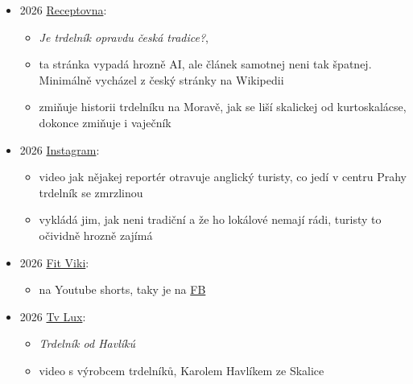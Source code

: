 \begin{itemize}
  \begin{itemize}
  \tightlist
  \item
     do trouby
  \end{itemize}
\item
  2026
  \href{https://www.receptovna.cz/cs/clanek/cestovani-a-svetove-kuchyne/je-trdelnik-opravdu-ceska-tradice}{Receptovna}:

  \begin{itemize}
  \tightlist
  \item
    \emph{Je trdelník opravdu česká tradice?}, 
  \item
    ta stránka vypadá hrozně AI, ale článek samotnej neni tak špatnej.
    Minimálně vycházel z český stránky na Wikipedii
  \item
    zmiňuje historii trdelníku na Moravě, jak se liší skalickej od
    kurtoskalácse, dokonce zmiňuje i vaječník
  \end{itemize}
\item
  2026 \href{https://www.instagram.com/reel/DeOWVe0iMHz/}{Instagram}:

  \begin{itemize}
  \tightlist
  \item
    video jak nějakej reportér otravuje anglický turisty, co jedí v
    centru Prahy trdelník se zmrzlinou
  \item
    vykládá jim, jak neni tradiční a že ho lokálové nemají rádi, turisty
    to očividně hrozně zajímá
  \end{itemize}
\item
  2026 \href{https://www.youtube.com/shorts/MItlyIk2tow}{Fit Viki}:

  \begin{itemize}
  \tightlist
  \item
     na Youtube shorts, taky je na
    \href{https://www.facebook.com/share/r/1EzDwDrzY2/}{FB}
  \end{itemize}
\item
  2026 \href{https://www.tvlux.sk/archiv/play/na-tanieri-16}{Tv Lux}:

  \begin{itemize}
  \tightlist
  \item
    \emph{Trdelník od Havlíkú}
  \item
    video  s výrobcem trdelníků, Karolem Havlíkem ze
    Skalice
  \end{itemize}
\end{itemize}

